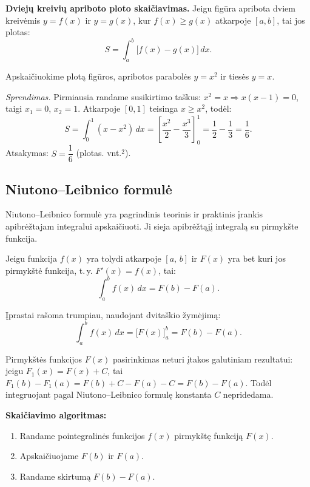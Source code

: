 \textbf{Dviejų kreivių apriboto ploto skaičiavimas.} Jeigu figūra apribota dviem kreivėmis 
$y = f(x)$ ir $y = g(x)$, kur $f(x) \geq g(x)$ atkarpoje $[a,b]$, tai jos plotas:
\[
S = \int_a^b \bigl[f(x) - g(x)\bigr]\,dx.
\]

\begin{example}
Apskaičiuokime plotą figūros, apribotos parabolės $y = x^2$ ir tiesės $y = x$.

\textit{Sprendimas.} Pirmiausia randame susikirtimo taškus: $x^2 = x \Rightarrow x(x-1) = 0$, 
taigi $x_1 = 0$, $x_2 = 1$. Atkarpoje $[0,1]$ teisinga $x \geq x^2$, todėl:
\[
S = \int_0^1 (x - x^2)\,dx = \left[\frac{x^2}{2} - \frac{x^3}{3}\right]_0^1 
  = \frac{1}{2} - \frac{1}{3} = \frac{1}{6}.
\]
Atsakymas: $S = \dfrac{1}{6}$ (plotas. vnt.$^2$).
\end{example}

\subsection{Niutono–Leibnico formulė}

Niutono–Leibnico formulė yra pagrindinis teorinis ir praktinis įrankis apibrėžtajam integralui 
apskaičiuoti. Ji sieja apibrėžtąjį integralą su pirmykšte funkcija.

\begin{theorem}
Jeigu funkcija $f(x)$ yra tolydi atkarpoje $[a,\,b]$ ir $F(x)$ yra bet kuri jos pirmykštė 
funkcija, t.\,y. $F'(x) = f(x)$, tai:
\[
\boxed{\int_a^b f(x)\,dx = F(b) - F(a).}
\]
\end{theorem}

Įprastai rašoma trumpiau, naudojant dvitaškio žymėjimą:
\[
\int_a^b f(x)\,dx = \Big[F(x)\Big]_a^b = F(b) - F(a).
\]

\begin{remark}
Pirmykštės funkcijos $F(x)$ pasirinkimas neturi įtakos galutiniam rezultatui: jeigu 
$F_1(x) = F(x) + C$, tai $F_1(b) - F_1(a) = F(b) + C - F(a) - C = F(b) - F(a)$. 
Todėl integruojant pagal Niutono–Leibnico formulę konstanta $C$ nepridedama.
\end{remark}

\textbf{Skaičiavimo algoritmas:}
\begin{enumerate}
    \item Randame pointegralinės funkcijos $f(x)$ pirmykštę funkciją $F(x)$.
    \item Apskaičiuojame $F(b)$ ir $F(a)$.
    \item Randame skirtumą $F(b) - F(a)$.
\end{enumerate}

